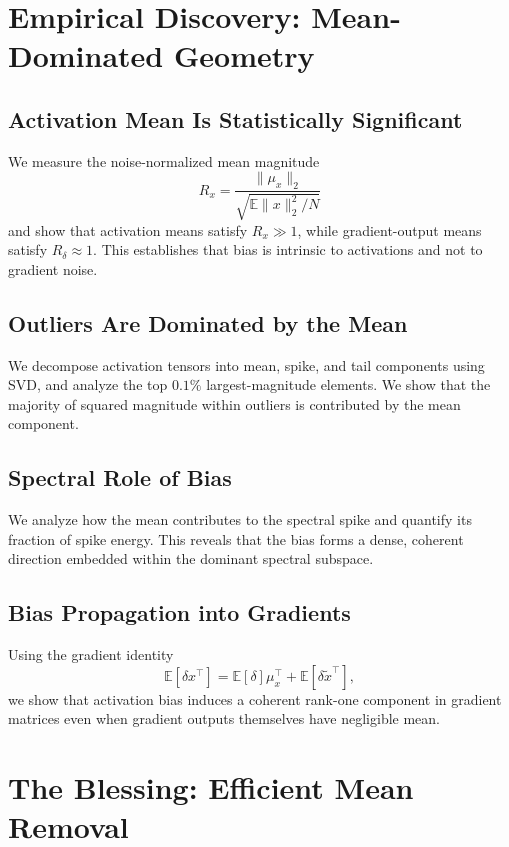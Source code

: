 
\section{Empirical Discovery: Mean-Dominated Geometry}
\label{sec:discovery}

\subsection{Activation Mean Is Statistically Significant}
\label{subsec:mean_significance}

We measure the noise-normalized mean magnitude
\[
R_x = \frac{\|\mu_x\|_2}{\sqrt{\mathbb{E}\|x\|_2^2 / N}}
\]
and show that activation means satisfy $R_x \gg 1$, while gradient-output means
satisfy $R_\delta \approx 1$.
This establishes that bias is intrinsic to activations and not to gradient noise.


\subsection{Outliers Are Dominated by the Mean}
\label{subsec:outlier_dominance}

We decompose activation tensors into mean, spike, and tail components using SVD,
and analyze the top $0.1\%$ largest-magnitude elements.
We show that the majority of squared magnitude within outliers is contributed
by the mean component.


\subsection{Spectral Role of Bias}
\label{subsec:spectral_role}

We analyze how the mean contributes to the spectral spike and quantify
its fraction of spike energy.
This reveals that the bias forms a dense, coherent direction embedded
within the dominant spectral subspace.


\subsection{Bias Propagation into Gradients}
\label{subsec:bias_propagation}

Using the gradient identity
\[
\mathbb{E}[\delta x^\top]
=
\mathbb{E}[\delta]\mu_x^\top
+
\mathbb{E}[\delta \tilde{x}^\top],
\]
we show that activation bias induces a coherent rank-one component
in gradient matrices even when gradient outputs themselves have negligible mean.


\section{The Blessing: Efficient Mean Removal}
\label{sec:mean_removal}

